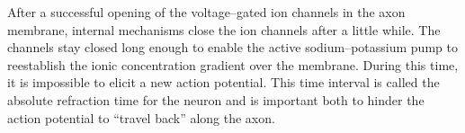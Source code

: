 		After a successful opening of the voltage--gated ion channels in the axon membrane, internal mechanisms close the ion channels after a little while.
		The channels stay closed long enough to enable the active sodium--potassium pump to reestablish the ionic concentration gradient over the membrane.
		During this time, it is impossible to elicit a new action potential.
		This time interval is called the absolute refraction time for the neuron and is important both to hinder the action potential to ``travel back'' along the axon.
		\cite{NeuroscienceExploringTheBrain3edKAP4} %


%		


	
